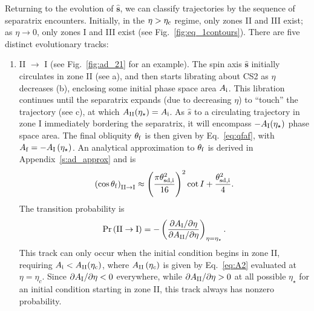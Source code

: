 \documentclass[
        fleqn,
        usenatbib,
    ]{mnras}
\newcommand*{\pdil}[2]{\partial#1 / \partial#2}
\newcommand*{\bm}[1]{\boldsymbol{\mathbf{#1}}}
\newcommand*{\uv}[1]{\hat{\bm{#1}}}
\newcommand*{\p}[1]{\left(#1\right)}
\begin{document}
Returning to the evolution of $\uv{s}$, we can classify trajectories by the
sequence of separatrix encounters. Initially, in the $\eta > \eta_{\rm c}$
regime, only zones II and III exist; as $\eta \to 0$, only zones I and III exist
(see Fig.~\ref{fig:eq_1contours}). There are five distinct evolutionary tracks:
\begin{enumerate}
    \item II $\to$ I (see Fig.~\ref{fig:ad_21} for an example). The spin axis
        $\uv{s}$ initially circulates in zone II (see a), and then starts
        librating about CS2 as $\eta$ decreases (b), enclosing some initial
        phase space area $A_{\rm i}$. This libration continues until the
        separatrix expands (due to decreasing $\eta$) to ``touch'' the
        trajectory (see c), at which $A_{\rm II}(\eta_\star) = A_{\rm i}$.
        As $\hat{s}$ to a
        circulating trajectory in zone I immediately bordering the separatrix,
        it will encompass $-A_{\rm I}(\eta_\star)$ phase space area. The final
        obliquity $\theta_{\rm f}$ is then given by Eq.~\eqref{eq:qfaf}, with
        $A_{\rm f} = -A_{\rm I}\p{\eta_\star}$. An analytical approximation to
        $\theta_{\rm f}$ is derived in Appendix~\ref{s:ad_approx} and is
        \begin{equation}
            \p{\cos \theta_{\rm f}}_{\rm II \to I} \approx
                \p{\frac{\pi \theta_{\rm sd, i}^2}{16}}^2 \cot I
                    + \frac{\theta_{\rm sd, i}^2}{4}.\label{eq:qf_21_approx}
        \end{equation}
        The transition probability is
        \begin{equation}
            \Pr\p{\mathrm{II} \to \mathrm{I}} = -\p{
                \frac{\pdil{A_{\rm I}}{\eta}}{\pdil{A_{\rm II}}{\eta}}}
                    _{\eta = \eta_{\star}}.
        \end{equation}
        This track can only occur when the initial condition begins in zone II,
        requiring $A_{\rm i} < A_{\rm II}(\eta_{\rm c})$, where $A_{\rm
        II}\p{\eta_c}$ is given by Eq.~\eqref{eq:A2} evaluated at $\eta =
        \eta_c$. Since $\pdil{A_{\rm I}}{\eta} < 0$ everywhere, while
        $\pdil{A_{\rm II}}{\eta} > 0$ at all possible $\eta_\star$ for an
        initial condition starting in zone II, this track always has nonzero
        probability.


\end{enumerate}
\end{document}
